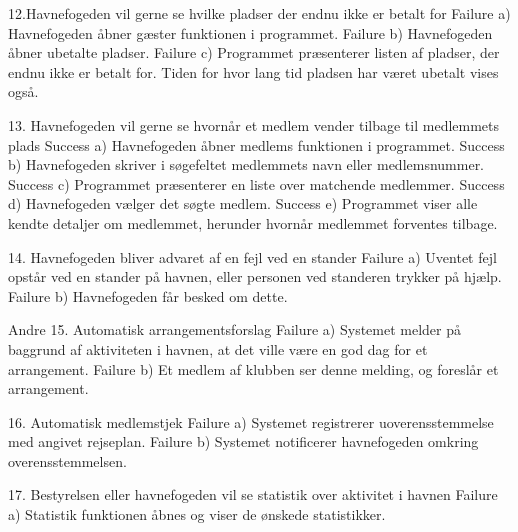 12.Havnefogeden vil gerne se hvilke pladser der endnu ikke er betalt for
			Failure a) Havnefogeden åbner gæster funktionen i programmet.
			Failure b) Havnefogeden åbner ubetalte pladser.
			Failure c) Programmet præsenterer listen af pladser, der endnu ikke er betalt for. Tiden for hvor lang tid pladsen har været ubetalt vises også.
      
13. Havnefogeden vil gerne se hvornår et medlem vender tilbage til medlemmets plads
			Success a) Havnefogeden åbner medlems funktionen i programmet.
			Success b) Havnefogeden skriver i søgefeltet medlemmets navn eller medlemsnummer.
			Success c) Programmet præsenterer en liste over matchende medlemmer.
			Success d) Havnefogeden vælger det søgte medlem.
			Success e) Programmet viser alle kendte detaljer om medlemmet, herunder hvornår medlemmet forventes tilbage.
      
14. Havnefogeden bliver advaret af en fejl ved en stander
			Failure a) Uventet fejl opstår ved en stander på havnen, eller personen ved standeren trykker på hjælp.
			Failure b) Havnefogeden får besked om dette.

		Andre
15. Automatisk arrangementsforslag
			Failure a) Systemet melder på baggrund af aktiviteten i havnen, at det ville være en god dag for et arrangement.
			Failure b) Et medlem af klubben ser denne melding, og foreslår et arrangement.
      
16. Automatisk medlemstjek
			Failure a) Systemet registrerer uoverensstemmelse med angivet rejseplan.
			Failure b) Systemet notificerer havnefogeden omkring overensstemmelsen.
    
17. Bestyrelsen eller havnefogeden vil se statistik over aktivitet i havnen
			Failure a) Statistik funktionen åbnes og viser de ønskede statistikker.